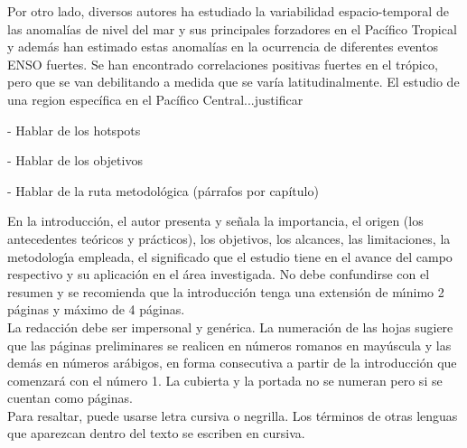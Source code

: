 Por otro lado, diversos autores ha estudiado la variabilidad espacio-temporal de las anomal\'{i}as de nivel del mar y sus principales forzadores en el Pac\'{i}fico Tropical y además han estimado estas anomal\'{i}as en la ocurrencia de diferentes eventos ENSO fuertes. Se han encontrado correlaciones positivas fuertes en el tr\'{o}pico, pero que se van debilitando a medida que se var\'{i}a latitudinalmente. El estudio de una region específica en el Pacífico Central...justificar

- Hablar de los hotspots

- Hablar de los objetivos

- Hablar de la ruta metodol\'{o}gica  (párrafos por capítulo)

En la introducci\'{o}n, el autor presenta y se\~{n}ala la importancia, el origen (los antecedentes te\'{o}ricos y pr\'{a}cticos), los objetivos, los alcances, las limitaciones, la metodolog\'{\i}a empleada, el significado que el estudio tiene en el avance del campo respectivo y su aplicaci\'{o}n en el \'{a}rea investigada. No debe confundirse con el resumen y se recomienda que la introducci\'{o}n tenga una extensi\'{o}n de m\'{\i}nimo 2 p\'{a}ginas y m\'{a}ximo de 4 p\'{a}ginas.\\


La redacci\'{o}n debe ser impersonal y gen\'{e}rica. La numeraci\'{o}n de las hojas sugiere que las p\'{a}ginas preliminares se realicen en n\'{u}meros romanos en may\'{u}scula y las dem\'{a}s en n\'{u}meros ar\'{a}bigos, en forma consecutiva a partir de la introducci\'{o}n que comenzar\'{a} con el n\'{u}mero 1. La cubierta y la portada no se numeran pero si se cuentan como p\'{a}ginas.\\

Para resaltar, puede usarse letra cursiva o negrilla. Los t\'{e}rminos de otras lenguas que aparezcan dentro del texto se escriben en cursiva.\\